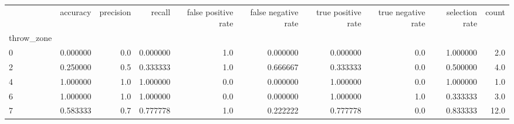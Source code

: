 \begin{tabular}{lrrrrrrrrr}
\toprule
{} &  accuracy &  precision &    recall &  false positive rate &  false negative rate &  true positive rate &  true negative rate &  selection rate &  count \\
throw\_zone &           &            &           &                      &                      &                     &                     &                 &        \\
\midrule
0          &  0.000000 &        0.0 &  0.000000 &                  1.0 &             0.000000 &            0.000000 &                 0.0 &        1.000000 &    2.0 \\
2          &  0.250000 &        0.5 &  0.333333 &                  1.0 &             0.666667 &            0.333333 &                 0.0 &        0.500000 &    4.0 \\
4          &  1.000000 &        1.0 &  1.000000 &                  0.0 &             0.000000 &            1.000000 &                 0.0 &        1.000000 &    1.0 \\
6          &  1.000000 &        1.0 &  1.000000 &                  0.0 &             0.000000 &            1.000000 &                 1.0 &        0.333333 &    3.0 \\
7          &  0.583333 &        0.7 &  0.777778 &                  1.0 &             0.222222 &            0.777778 &                 0.0 &        0.833333 &   12.0 \\
\bottomrule
\end{tabular}
